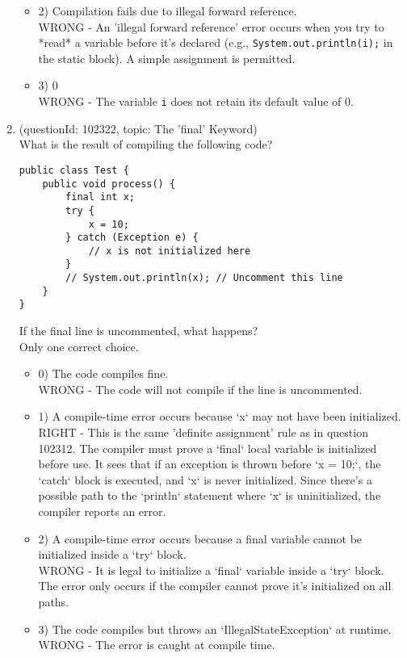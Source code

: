 \documentclass[12pt]{article}
\begin{document}
\begin{enumerate}[label=(\arabic*)]
\begin{itemize}
\item 2) Compilation fails due to illegal forward reference.
 \\ 
WRONG - An 'illegal forward reference' error occurs when you try to *read* a variable before it's declared (e.g., \verb|System.out.println(i);| in the static block). A simple assignment is permitted.

\item 3) 0
 \\ 
WRONG - The variable \verb|i| does not retain its default value of 0.

\end{itemize}
\item (questionId: 102322, topic: The 'final' Keyword) \\ 
What is the result of compiling the following code?\n\begin{verbatim}
public class Test {
    public void process() {
        final int x;
        try {
            x = 10;
        } catch (Exception e) {
            // x is not initialized here
        }
        // System.out.println(x); // Uncomment this line
    }
}
\end{verbatim}
If the final line is uncommented, what happens?
\\ \noindent Only one correct choice. 
\begin{itemize}
\item 0) The code compiles fine.
 \\ 
WRONG - The code will not compile if the line is uncommented.

\item 1) A compile-time error occurs because `x` may not have been initialized.
 \\ 
RIGHT - This is the same 'definite assignment' rule as in question 102312. The compiler must prove a `final` local variable is initialized before use. It sees that if an exception is thrown before `x = 10;`, the `catch` block is executed, and `x` is never initialized. Since there's a possible path to the `println` statement where `x` is uninitialized, the compiler reports an error.

\item 2) A compile-time error occurs because a final variable cannot be initialized inside a `try` block.
 \\ 
WRONG - It is legal to initialize a `final` variable inside a `try` block. The error only occurs if the compiler cannot prove it's initialized on all paths.

\item 3) The code compiles but throws an `IllegalStateException` at runtime.
 \\ 
WRONG - The error is caught at compile time.


\end{itemize}
\end{enumerate}
\end{document}
